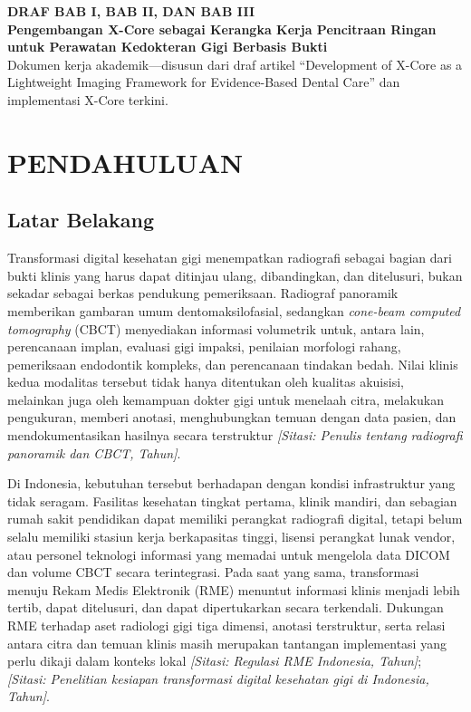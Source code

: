 \documentclass[12pt,a4paper,oneside]{report}
\newcommand{\sitasi}[1]{\textit{[Sitasi: #1]}}
\begin{document}
\begin{center}
{\Large \textbf{DRAF BAB I, BAB II, DAN BAB III}}\\[4pt]
{\large \textbf{Pengembangan X-Core sebagai Kerangka Kerja Pencitraan Ringan untuk Perawatan Kedokteran Gigi Berbasis Bukti}}\\[10pt]
{\normalsize Dokumen kerja akademik---disusun dari draf artikel ``Development of X-Core as a Lightweight Imaging Framework for Evidence-Based Dental Care'' dan implementasi X-Core terkini.}
\end{center}

\chapter{PENDAHULUAN}
\label{bab:pendahuluan}

\section{Latar Belakang}

Transformasi digital kesehatan gigi menempatkan radiografi sebagai bagian dari bukti klinis yang harus dapat ditinjau ulang, dibandingkan, dan ditelusuri, bukan sekadar sebagai berkas pendukung pemeriksaan. Radiograf panoramik memberikan gambaran umum dentomaksilofasial, sedangkan \textit{cone-beam computed tomography} (CBCT) menyediakan informasi volumetrik untuk, antara lain, perencanaan implan, evaluasi gigi impaksi, penilaian morfologi rahang, pemeriksaan endodontik kompleks, dan perencanaan tindakan bedah. Nilai klinis kedua modalitas tersebut tidak hanya ditentukan oleh kualitas akuisisi, melainkan juga oleh kemampuan dokter gigi untuk menelaah citra, melakukan pengukuran, memberi anotasi, menghubungkan temuan dengan data pasien, dan mendokumentasikan hasilnya secara terstruktur \sitasi{Penulis tentang radiografi panoramik dan CBCT, Tahun}.

Di Indonesia, kebutuhan tersebut berhadapan dengan kondisi infrastruktur yang tidak seragam. Fasilitas kesehatan tingkat pertama, klinik mandiri, dan sebagian rumah sakit pendidikan dapat memiliki perangkat radiografi digital, tetapi belum selalu memiliki stasiun kerja berkapasitas tinggi, lisensi perangkat lunak vendor, atau personel teknologi informasi yang memadai untuk mengelola data DICOM dan volume CBCT secara terintegrasi. Pada saat yang sama, transformasi menuju Rekam Medis Elektronik (RME) menuntut informasi klinis menjadi lebih tertib, dapat ditelusuri, dan dapat dipertukarkan secara terkendali. Dukungan RME terhadap aset radiologi gigi tiga dimensi, anotasi terstruktur, serta relasi antara citra dan temuan klinis masih merupakan tantangan implementasi yang perlu dikaji dalam konteks lokal \sitasi{Regulasi RME Indonesia, Tahun}; \sitasi{Penelitian kesiapan transformasi digital kesehatan gigi di Indonesia, Tahun}.
\end{document}
